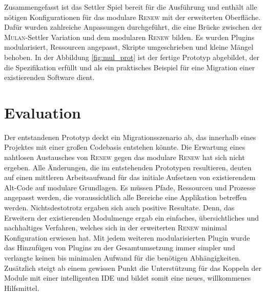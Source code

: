 	Zusammengefasst ist das Settler Spiel bereit für die Ausführung und enthält alle nötigen Konfigurationen für das modulare \textsc{Renew} mit der erweiterten Oberfläche. Dafür wurden zahlreiche Anpassungen durchgeführt, die eine Brücke zwischen der \textsc{Mulan}-Settler Variation und dem modularen \textsc{Renew} bilden. Es wurden Plugins modularisiert, Ressourcen angepasst, Skripte umgeschrieben und kleine Mängel behoben. \newline
	In der Abbildung \ref{fig:mul_prot} ist der fertige Prototyp abgebildet, der die Spezifikation erfüllt und als ein praktisches Beispiel für eine Migration einer existierenden Software dient. 

\section{Evaluation}
	Der entstandenen Prototyp deckt ein Migrationsszenario ab, das innerhalb eines Projektes mit einer großen Codebasis entstehen könnte. Die Erwartung eines nahtlosen Austausches von \textsc{Renew} gegen das modulare \textsc{Renew} hat sich nicht ergeben. Alle Änderungen, die im entstehenden Prototypen resultieren, deuten auf einen mittleren Arbeitsaufwand für das initiale Aufsetzen von existierendem Alt-Code auf modulare Grundlagen. Es müssen Pfade, Ressourcen und Prozesse angepasst werden, die voraussichtlich alle Bereiche eine Applikation betreffen werden.\newline
	Nichtsdestotrotz ergaben sich auch positive Resultate. Denn, das Erweitern der existierenden Modulmenge ergab ein einfaches, übersichtliches und nachhaltiges Verfahren, welches sich in der erweiterten \textsc{Renew} minimal Konfiguration erwiesen hat. Mit jedem weiteren modularisierten Plugin wurde das Hinzufügen von Plugins zu der Gesamtumsetzung immer simpler und verlangte keinen bis minimalen Aufwand für die benötigen Abhängigkeiten. Zusätzlich steigt ab einem gewissen Punkt die Unterstützung für das Koppeln der Module mit einer intelligenten IDE und bildet somit eine neues, willkommenes Hilfsmittel.
